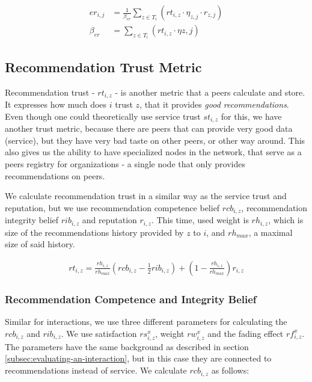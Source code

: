 \begin{equation}
\label{eq:estimated-reputation}
\begin{split}
    er_{i,j} &= \frac{1}{\beta_{er}} \sum_{z \in T_{i}} \left(rt_{i, z} \cdot \eta_{z, j} \cdot r_{z, j}\right) \\
    \beta_{er} &= \sum_{z \in T_{i}} \left(rt_{i, z} \cdot \eta{z, j}\right)
\end{split}
\end{equation}

\subsection{Recommendation Trust Metric}
\label{subsec:recommendation-trust-metric}
Recommendation trust - $rt_{i,z}$ - is another metric that a peers calculate and store. It expresses how much does $i$ trust $z$, that it provides \textit{good recommendations}.
Even though one could theoretically use service trust $st_{i, z}$ for this,
we have another trust metric, because there are peers that can provide very good data (service), but they have very bad taste on other peers, or other way around.
This also gives us the ability to have specialized nodes in the network, that serve as a peers registry for organizations - a single node that only provides recommendations on peers.

We calculate recommendation trust in a similar way as the service trust and reputation, but we use recommendation competence belief $rcb_{i, z}$, recommendation integrity belief $rib_{i,z}$ and reputation $r_{i, z}$.
This time, used weight is $rh_{i,z}$, which is size of the recommendations history provided by $z$ to $i$, and $rh_{max}$, a maximal size of said history.

\begin{equation}
\label{eq:recommendation-trust}
\begin{split}
    rt_{i, z} = \frac{rh_{i,z}}{rh_{max}} \left(rcb_{i,z} - \frac{1}{2} rib_{i, z} \right) + \left(1 - \frac{rh_{i,z}}{rh_{max}} \right) r_{i,z}
\end{split}
\end{equation}

\subsubsection{Recommendation Competence and Integrity Belief}
\label{subsubsec:recommendation-competence-integrity-belief}
Similar for interactions, we use three different parameters for calculating the $rcb_{i, z}$ and $rib_{i,z}$. 
We use satisfaction $rs^{x}_{i, z}$, weight $rw^{x}_{i, z}$ and the fading effect $rf^{x}_{i, z}$. 
The parameters have the same background as described in section \ref{subsec:evaluating-an-interaction}, but in this case they are connected to recommendations instead of service.
We calculate $rcb_{i, z}$ as follows:

